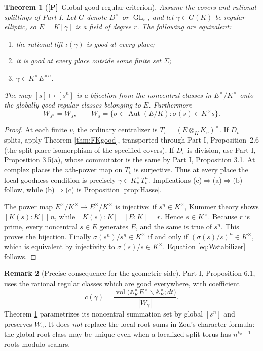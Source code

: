 \documentclass[11pt]{article}
\newcommand{\A}{\mathbb A}
\newcommand{\GL}{\operatorname{GL}}
\newcommand{\vol}{\operatorname{vol}}
\newcommand{\Aut}{\operatorname{Aut}}
\newcommand{\Ptag}{\textnormal{\textbf{[P]}}}
\theoremstyle{plain}
\newtheorem{theorem}{Theorem}[section]
\theoremstyle{definition}
\newtheorem{remark}[theorem]{Remark}
\begin{document}
\begin{theorem}[\Ptag\ Global good-regular criterion]\label{thm:globalgood}
Assume the covers and rational splittings of Part I.  Let
$G$ denote $D^\times$ or $\GL_r$, and let $\gamma\in G(K)$ be
regular elliptic, so $E=K[\gamma]$ is a field of degree $r$.
The following are equivalent:
\begin{enumerate}[label=(\alph*)]
\item the rational lift $\iota(\gamma)$ is good at every place;
\item it is good at every place outside some finite set $\Sigma$;
\item $\gamma\in K^\times E^{\times n}$.
\end{enumerate}
The map $[s]\mapsto[s^n]$ is a bijection from the noncentral
classes in $E^\times/K^\times$ onto the globally good regular
classes belonging to $E$.  Furthermore
\begin{equation}\label{eq:Wstabilizer}
 W_{s^n}=W_s,\qquad
 W_s=\{\sigma\in\Aut(E/K):\sigma(s)\in K^\times s\}.
\end{equation}
\end{theorem}
\begin{proof}
At each finite $v$, the ordinary centralizer is
$T_v=(E\otimes_K K_v)^\times$.  If $D_v$ splits, apply
Theorem \ref{thm:FKgood}, transported through Part I, Proposition~2.6 (the split-place
isomorphism of the specified covers).  If $D_v$ is division, use Part I,
Proposition 3.5(a), whose commutator is the same by Part I,
Proposition 3.1.  At complex places the $n$th-power map on
$T_v$ is surjective.  Thus at every place the local goodness
condition is precisely
$\gamma\in K_v^\times T_v^n$.
Implications (c)$\Rightarrow$(a)$\Rightarrow$(b) follow,
while (b)$\Rightarrow$(c) is Proposition \ref{prop:Hasse}.

The power map $E^\times/K^\times\to E^\times/K^\times$
is injective: if $s^n\in K^\times$, Kummer theory shows
$[K(s):K]\mid n$, while $[K(s):K]\mid [E:K]=r$.
Hence $s\in K^\times$.  Because $r$ is prime, every noncentral
$s\in E$ generates $E$, and the same is true of $s^n$.
This proves the bijection.  Finally
$\sigma(s^n)/s^n\in K^\times$ if and only if
$(\sigma(s)/s)^n\in K^\times$, which is equivalent by injectivity
to $\sigma(s)/s\in K^\times$.  Equation \eqref{eq:Wstabilizer}
follows.
\end{proof}

\begin{remark}[Precise consequence for the geometric side]
Part I, Proposition 6.1, uses the rational regular classes which
are good everywhere, with coefficient
\begin{equation}\label{eq:globalvol}
 c(\gamma)=\frac{\vol\bigl(\A_K^\times E^\times\backslash
 \A_E^\times;dt\bigr)}{|W_\gamma|}.
\end{equation}
Theorem \ref{thm:globalgood} parametrizes its noncentral
summation set by global $[s^n]$ and preserves $W_\gamma$.
It does \emph{not} replace the local root sums in Zou's
character formula: the global root class may be unique even when
a localized split torus has $n^{k_v-1}$ roots modulo scalars.
\end{remark}
\end{document}
